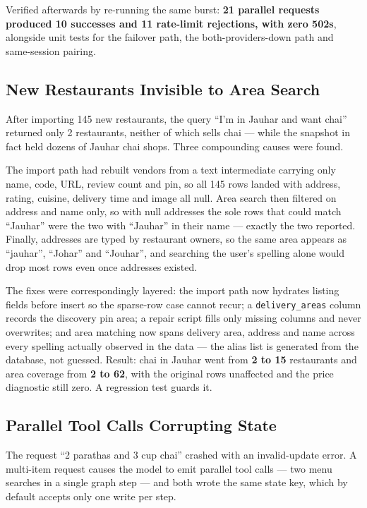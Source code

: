 \documentclass[11pt,a4paper]{article}
\newcommand{\code}[1]{\texttt{\small #1}}
\begin{document}
Verified afterwards by re-running the same burst: \textbf{21 parallel requests
produced 10 successes and 11 rate-limit rejections, with zero 502s}, alongside
unit tests for the failover path, the both-providers-down path and
same-session pairing.

\subsection{New Restaurants Invisible to Area Search}
\label{sec:areabug}

After importing 145 new restaurants, the query ``I'm in Jauhar and want chai''
returned only 2 restaurants, neither of which sells chai --- while the
snapshot in fact held dozens of Jauhar chai shops. Three compounding causes
were found.

The import path had rebuilt vendors from a text intermediate carrying only
name, code, URL, review count and pin, so all 145 rows landed with address,
rating, cuisine, delivery time and image all null. Area search then filtered on
address and name only, so with null addresses the sole rows that could match
``Jauhar'' were the two with ``Jauhar'' in their name --- exactly the two
reported. Finally, addresses are typed by restaurant owners, so the same area
appears as ``jauhar'', ``Johar'' and ``Jouhar'', and searching the user's
spelling alone would drop most rows even once addresses existed.

The fixes were correspondingly layered: the import path now hydrates listing
fields before insert so the sparse-row case cannot recur; a
\code{delivery\_areas} column records the discovery pin area; a repair script
fills only missing columns and never overwrites; and area matching now spans
delivery area, address and name across every spelling actually observed in the
data --- the alias list is generated from the database, not guessed. Result:
chai in Jauhar went from \textbf{2 to 15} restaurants and area coverage from
\textbf{2 to 62}, with the original rows unaffected and the price diagnostic
still zero. A regression test guards it.

\subsection{Parallel Tool Calls Corrupting State}
\label{sec:parallel}

The request ``2 parathas and 3 cup chai'' crashed with an invalid-update error.
A multi-item request causes the model to emit parallel tool calls --- two menu
searches in a single graph step --- and both wrote the same state key, which by
default accepts only one write per step.
\end{document}
